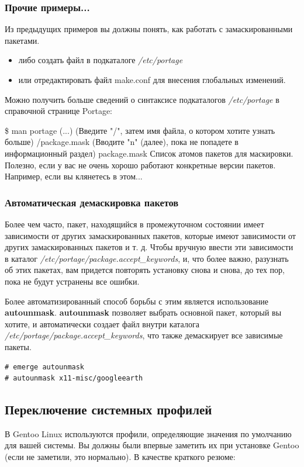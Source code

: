 \documentclass[10pt]{book}
\begin{document}
\subsubsection{Прочие примеры...}
Из предыдущих примеров вы должны понять, как работать с замаскированными пакетами.
\begin{itemize}
 \item либо создать файл в подкаталоге \textit{/etc/portage}
 \item или отредактировать файл  make.conf для внесения глобальных изменений.
\end{itemize}
Можно получить больше сведений о синтаксисе подкаталогов  \textit{/etc/portage} в справочной странице Portage:
 \begin{tcolorbox}
\$ man portage
(...)
(Введите "/", затем имя файла, о котором хотите узнать больше)
/package.mask
(Вводите "n" (далее), пока не попадете в информационный раздел)
package.mask
Список атомов пакетов для маскировки. Полезно, если  у вас не очень 
хорошо работают конкретные версии пакетов. Например,
если вы клянетесь в этом...
\end{tcolorbox}

\subsubsection{Автоматическая демаскировка пакетов}
Более чем часто, пакет, находящийся в промежуточном состоянии имеет зависимости  от других замаскированных пакетов, которые имеют зависимости от других замаскированных пакетов и т. д. Чтобы вручную ввести эти зависимости в каталог \textit{ /etc/portage/package.accept\_keywords}, и, что более важно, разузнать об этих пакетах, вам придется повторять установку снова и снова, до тех пор, пока не будут устранены все ошибки.

Более автоматизированный способ борьбы с этим является использование \textbf{autounmask}. \textbf{autounmask} позволяет выбрать основной пакет, который вы хотите, и автоматически создает файл внутри каталога \textit{ /etc/portage/package.accept\_keywords}, что также демаскирует все зависимые пакеты.
 \begin{tcolorbox}
\begin{lstlisting}
# emerge autounmask
# autounmask x11-misc/googleearth
\end{lstlisting}
\end{tcolorbox}
\subsection{Переключение системных профилей}
В Gentoo Linux используются профили, определяющие значения по умолчанию для вашей системы. Вы должны были впервые заметить их при установке Gentoo (если не заметили, это нормально). В качестве краткого резюме: 
\end{document}
